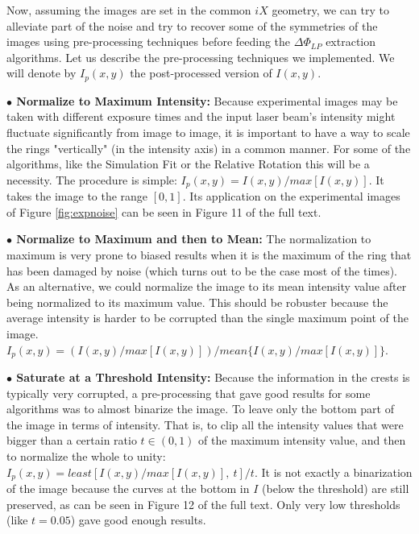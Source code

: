 \documentclass[11pt, a4paper, twoside]{article} %
\begin{document}
Now, assuming the images are set in the common $iX$ geometry, we can try to alleviate part of the noise and try to recover some of the symmetries of the images using pre-processing techniques before feeding the $\Delta \Phi_{LP}$ extraction algorithms. Let us describe the pre-processing techniques we implemented. We will denote by $I_p(x,y)$ the post-processed version of $I(x,y)$.

{\bf $\bullet$ Normalize to Maximum Intensity:} Because experimental images may be taken with different exposure times and the input laser beam's intensity might fluctuate significantly from image to image, it is important to have a way to scale the rings "vertically" (in the intensity axis) in a common manner. For some of the algorithms, like the Simulation Fit or the Relative Rotation this will be a necessity. The procedure is simple: $I_p(x,y) = I(x,y)/max[I(x,y)]$. It takes the image to the range $[0,1]$. Its application on the experimental images of Figure \ref{fig:expnoise} can be seen in Figure 11 of the full text.

{\bf $\bullet$ Normalize to Maximum and then to Mean:} The normalization to maximum is very prone to biased results when it is the maximum of the ring that has been damaged by noise (which turns out to be the case most of the times). As an alternative, we could normalize the image to its mean intensity value after being normalized to its maximum value. This should be robuster because the average intensity is harder to be corrupted than the single maximum point of the image.  $I_p(x,y) = (I(x,y)/max[I(x,y)])/mean\{I(x,y)/max[I(x,y)]\}$.

{\bf $\bullet$ Saturate at a Threshold Intensity:} Because the information in the crests is typically very corrupted, a pre-processing that gave good results for some algorithms was to almost binarize the image. To leave only the bottom part of the image in terms of intensity. That is, to clip all the intensity values that were bigger than a certain ratio $t\in(0,1)$ of the maximum intensity value, and then to normalize the whole to unity: $I_p(x,y)=least[I(x,y)/max[I(x,y)],\ t]/t$. It is not exactly a binarization of the image because the curves at the bottom in $I$ (below the threshold) are still preserved, as can be seen in Figure 12 of the full text. Only very low thresholds (like $t=0.05$) gave good enough results.
\end{document}
